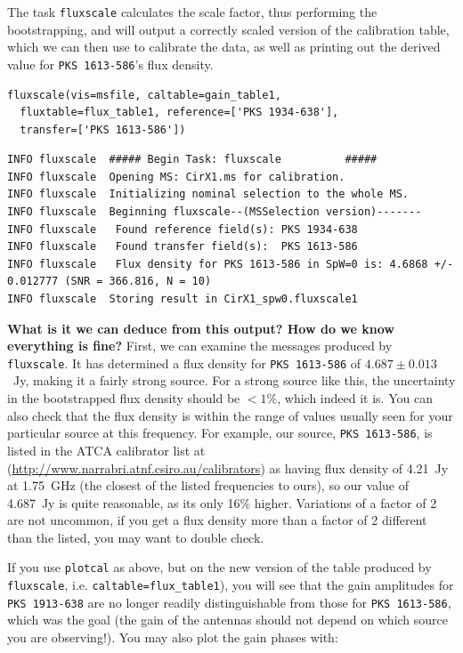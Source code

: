 \documentclass[force,almostfull,justified]{tufte-book}
\begin{document}
The task {\tt fluxscale} calculates the scale factor, thus performing the bootstrapping, and will
output a correctly scaled version of the calibration table, which we can then use to calibrate the
data, as well as printing out the derived value for {\tt PKS 1613-586}'s flux density.

\begin{casacmd}
\begin{verbatim}
fluxscale(vis=msfile, caltable=gain_table1,
  fluxtable=flux_table1, reference=['PKS 1934-638'],
  transfer=['PKS 1613-586'])
\end{verbatim}
\end{casacmd}

\begin{casaoutput}
\begin{verbatim}
INFO fluxscale	##### Begin Task: fluxscale          #####
INFO fluxscale	Opening MS: CirX1.ms for calibration.
INFO fluxscale	Initializing nominal selection to the whole MS.
INFO fluxscale	Beginning fluxscale--(MSSelection version)-------
INFO fluxscale	 Found reference field(s): PKS 1934-638
INFO fluxscale	 Found transfer field(s):  PKS 1613-586
INFO fluxscale	 Flux density for PKS 1613-586 in SpW=0 is: 4.6868 +/- 0.012777 (SNR = 366.816, N = 10)
INFO fluxscale	Storing result in CirX1_spw0.fluxscale1
\end{verbatim}
\end{casaoutput}

{\bf What is it we can deduce from this output? How do we know everything is fine?}  First, we can
examine the messages produced by {\tt fluxscale}.  It has determined a flux density for {\tt PKS
1613-586} of $4.687 \pm 0.013$~Jy, making it a fairly strong source.  For a strong source like this,
the uncertainty in the bootstrapped flux density should be $<1$\%, which indeed it is.  You can also
check that the flux density is within the range of values usually seen for your particular source at
this frequency.  For example, our source, {\tt PKS 1613-586}, is listed in the ATCA calibrator list at
(\url{http://www.narrabri.atnf.csiro.au/calibrators}) as having flux density of 4.21~Jy at 1.75~GHz
(the closest of the listed frequencies to ours), so our value of 4.687~Jy is quite reasonable, as its
only 16\% higher.  Variations of a factor of 2 are not uncommon, if you get a flux density more than a
factor of 2 different than the listed, you may want to double check.

If you use {\tt plotcal} as above, but on the new version of the table produced by {\tt fluxscale},
i.e. {\tt caltable=flux\_table1}), you will see that the gain amplitudes for {\tt PKS 1913-638} are no
longer readily distinguishable from those for {\tt PKS 1613-586}, which was the goal (the gain of the
antennas should not depend on which source you are observing!).  You may also plot the gain phases
with:
\end{document}
